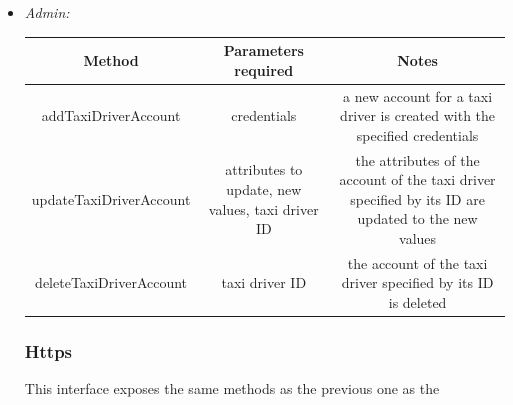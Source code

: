 \documentclass{article}
\begin{document}
\begin{itemize}
\begin{table}[H]
\begin{adjustbox}{width=1.2\textwidth}
\begin{tabular}{*{3}{c}}
				\bottomrule
			\end{tabular}
		\end{adjustbox}
	\end{table}		
	\item \textit{Admin:} \\
	\begin{table}[H]
		\begin{adjustbox}{width=1.2\textwidth}	
			\begin{tabular}{*{3}{c}}
				\toprule
				Method & Parameters required & Notes \\
				\midrule
				addTaxiDriverAccount & credentials & a new account for a taxi driver is created with the specified credentials\\ 
				updateTaxiDriverAccount & attributes to update, new values, taxi driver ID & the attributes of the account of the taxi driver specified by its ID are updated to the new values\\ 
				deleteTaxiDriverAccount & taxi driver ID & the account of the taxi driver specified by its ID is deleted\\
				\bottomrule
			\end{tabular}
		\end{adjustbox}	
	\end{table}	
\subsubsection{Https} %
This interface exposes the same methods as the previous one as the 
		

\end{itemize}
\end{document}
